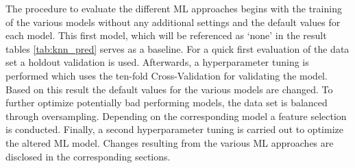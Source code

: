 The procedure to evaluate the different ML approaches begins with the training of the various models without any additional settings and the default values for each model. This first model, which will be referenced as \enquote*{none} in the result tables \ref{tab:knn_pred} serves as a baseline. For a quick first evaluation of the data set a holdout validation is used. Afterwards, a hyperparameter tuning is performed which uses the ten-fold Cross-Validation for validating the model. %
Based on this result the default values for the various models are changed. To further optimize potentially bad performing models, the data set is balanced through oversampling. Depending on the corresponding model a feature selection is conducted. Finally, a second hyperparameter tuning is carried out to optimize the altered ML model. Changes resulting from the various ML approaches are disclosed in the corresponding sections.


